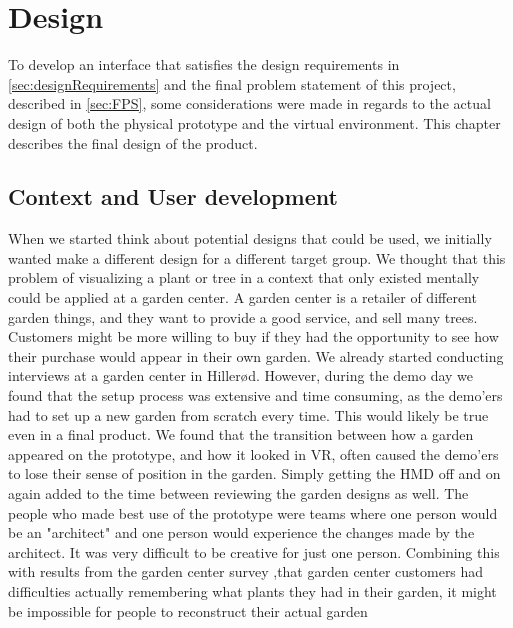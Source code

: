 \chapter{Design}
To develop an interface that satisfies the design requirements in \autoref{sec:designRequirements} and the final problem statement of this project, described in \autoref{sec:FPS}, some considerations were made in regards to the actual design of both the physical prototype and the virtual environment. This chapter describes the final design of the product.

\section{Context and User development}
When we started think about potential designs that could be used, we initially wanted make a different design for a different target group. We thought that this problem of visualizing a plant or tree in a context that only existed mentally could be applied at a garden center. A garden center is a retailer of different garden things, and they want to provide a good service, and sell many trees. Customers might be more willing to buy if they had the opportunity to see how their purchase would appear in their own garden. We already started conducting interviews at a garden center in Hillerød. However, during the demo day we found that the setup process was extensive and time consuming, as the demo'ers had to set up a new garden from scratch every time. This would likely be true even in a final product. We found that the transition between how a garden appeared on the prototype, and how it looked in VR, often caused the demo'ers to lose their sense of position in the garden. Simply getting the HMD off and on again added to the time between reviewing the garden designs as well. The people who made best use of the prototype were teams where one person would be an "architect" and one person would experience the changes made by the architect. It was very difficult to be creative for just one person. Combining this with results from the garden center survey ,that garden center customers had difficulties actually remembering what plants they had in their garden, it might be impossible for people to reconstruct their actual garden\\

